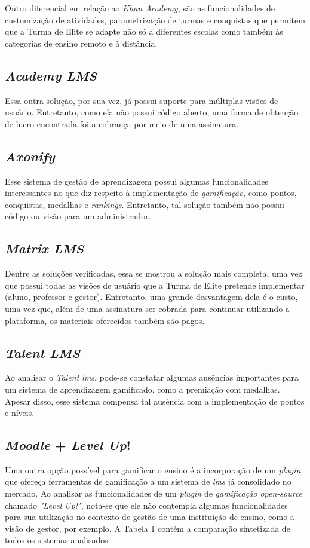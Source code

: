 \documentclass[
    12pt,               %
    openright,          %
    oneside,
    a4paper,            %
    paginasA3,  %
    english,            %
    brazil              %
    ]{ifsp-spo-inf-ctds} %
\begin{document}
Outro diferencial em relação ao \textit{Khan Academy}, são as funcionalidades de customização de atividades, parametrização de turmas e conquistas que permitem que a Turma de Elite se adapte não só a diferentes escolas como também às categorias de ensino remoto e à distância.

\subsection{\textit{Academy LMS}}
Essa outra solução, por sua vez, já possui suporte para múltiplas visões de usuário.
Entretanto, como ela não possui código aberto, uma forma de obtenção de lucro encontrada foi a cobrança por meio de uma assinatura.

\subsection{\textit{Axonify}}
Esse sistema de gestão de aprendizagem possui algumas funcionalidades interessantes no que diz respeito à implementação de \textit{gamificação}, como pontos, conquistas, medalhas e \textit{\glspl{ranking}}. Entretanto, tal solução também não possui código ou visão para um administrador. 

\subsection{\textit{Matrix LMS}}
Dentre as soluções verificadas, essa se mostrou a solução mais completa, uma vez que possui todas as visões de usuário que a Turma de Elite pretende implementar (aluno, professor e gestor). Entretanto, uma grande desvantagem dela é o custo, uma vez que, além de uma assinatura ser cobrada para continuar utilizando a plataforma, os materiais oferecidos também são pagos.  

\subsection{\textit{Talent LMS}}
Ao analisar o \textit{Talent \ac{lms}}, pode-se constatar algumas ausências importantes para um sistema de aprendizagem gamificado, como a premiação com medalhas. Apesar disso, esse sistema compensa tal ausência com a implementação de pontos e níveis.


\subsection{\textit{Moodle} + \textit{Level Up}!}
Uma outra opção possível para gamificar o ensino é a incorporação de um \textit{\gls{plugin}} que ofereça ferramentas de gamificação a um sistema de \textit{\ac{lms}} já consolidado no mercado. Ao analisar as funcionalidades de um \textit{\gls{plugin}} de \textit{gamificação} \textit{\gls{open-source}} chamado \textit{"Level Up!"}, nota-se que ele não contempla algumas funcionalidades para sua utilização no contexto de gestão de uma instituição de ensino, como a visão de gestor, por exemplo.
A Tabela 1 contém a comparação sintetizada de todos os sistemas analisados.
\end{document}
